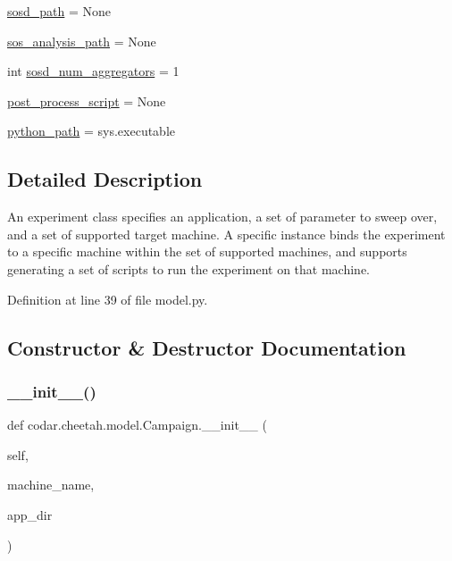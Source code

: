 \begin{DoxyCompactItemize}
\hyperlink{classcodar_1_1cheetah_1_1model_1_1_campaign_af655e512e1d8b7a3bd5104d890dab023}{sosd\+\_\+path} = None
\item 
\hyperlink{classcodar_1_1cheetah_1_1model_1_1_campaign_a521eea7dac8df14f3ea9174cd6297340}{sos\+\_\+analysis\+\_\+path} = None
\item 
int \hyperlink{classcodar_1_1cheetah_1_1model_1_1_campaign_a8cdebf43b605e4ac036fbf4e0b9e7d15}{sosd\+\_\+num\+\_\+aggregators} = 1
\item 
\hyperlink{classcodar_1_1cheetah_1_1model_1_1_campaign_a7452ae0f9b6946a5e531cf6bebd55179}{post\+\_\+process\+\_\+script} = None
\item 
\hyperlink{classcodar_1_1cheetah_1_1model_1_1_campaign_af71218dfabb60e7f23997a0a8f1e1158}{python\+\_\+path} = sys.\+executable
\end{DoxyCompactItemize}


\subsection{Detailed Description}
\begin{DoxyVerb}An experiment class specifies an application, a set of parameter to
sweep over, and a set of supported target machine. A specific instance
binds the experiment to a specific machine within the set of supported
machines, and supports generating a set of scripts to run the experiment
on that machine.\end{DoxyVerb}
 

Definition at line 39 of file model.\+py.



\subsection{Constructor \& Destructor Documentation}
\mbox{\label{classcodar_1_1cheetah_1_1model_1_1_campaign_ad1b15b5ae37794b2568fe8460f36eab6}} 
\subsubsection{\texorpdfstring{\+\_\+\+\_\+init\+\_\+\+\_\+()}{\_\_init\_\_()}}
{\footnotesize\ttfamily def codar.\+cheetah.\+model.\+Campaign.\+\_\+\+\_\+init\+\_\+\+\_\+ (\begin{DoxyParamCaption}\item[{}]{self,  }\item[{}]{machine\+\_\+name,  }\item[{}]{app\+\_\+dir }\end{DoxyParamCaption})}



